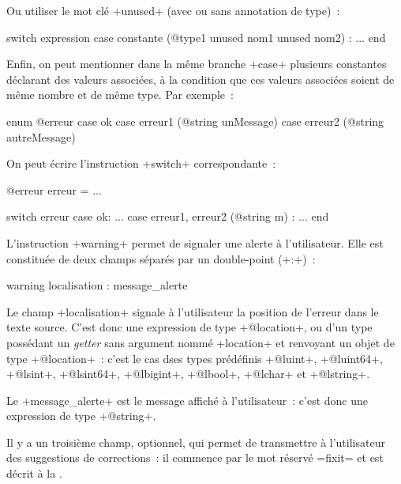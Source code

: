 Ou utiliser le mot clé \ggs+unused+ (avec ou sans annotation de type)~:
\begin{galgas}
switch expression
case constante (@type1 unused nom1 unused nom2) :
...
end
\end{galgas}


Enfin, on peut mentionner dans la même branche \ggs+case+ plusieurs constantes déclarant des valeurs associées, à la condition que ces valeurs associées soient de même nombre et de même type. Par exemple~:

\begin{galgas}
enum @erreur {
  case ok
  case erreur1 (@string unMessage)
  case erreur2 (@string autreMessage) 
}
\end{galgas}

On peut écrire l'instruction \ggs+switch+ correspondante~:
\begin{galgas}
@erreur erreur = ...

switch erreur
case ok:
  ...
case erreur1, erreur2 (@string m) :
  ...
end
\end{galgas}





L'instruction \ggs+warning+ permet de signaler une alerte à l'utilisateur. Elle est constituée de deux champs séparés par un double-point (\ggs+:+)~:

\begin{galgas}
warning localisation : message_alerte
\end{galgas}



Le champ \ggs+localisation+ signale à l'utilisateur la position de l'erreur dans le texte source. C'est donc une expression de type \ggs+@location+, ou d'un type possédant un \emph{getter} sans argument nommé \ggs+location+ et renvoyant un objet de type \ggs+@location+~: c'est le cas dses types prédéfinis \ggs+@luint+, \ggs+@luint64+, \ggs+@lsint+, \ggs+@lsint64+, \ggs+@lbigint+, \ggs+@lbool+, \ggs+@lchar+ et \ggs+@lstring+.


Le \ggs+message_alerte+ est le message affiché à l'utilisateur~: c'est donc une expression de type \ggs+@string+.

Il y a un troisième champ, optionnel, qui permet de transmettre à l'utilisateur des suggestions de corrections~: il commence par le mot réservé \ggs=fixit= et est décrit à la .


